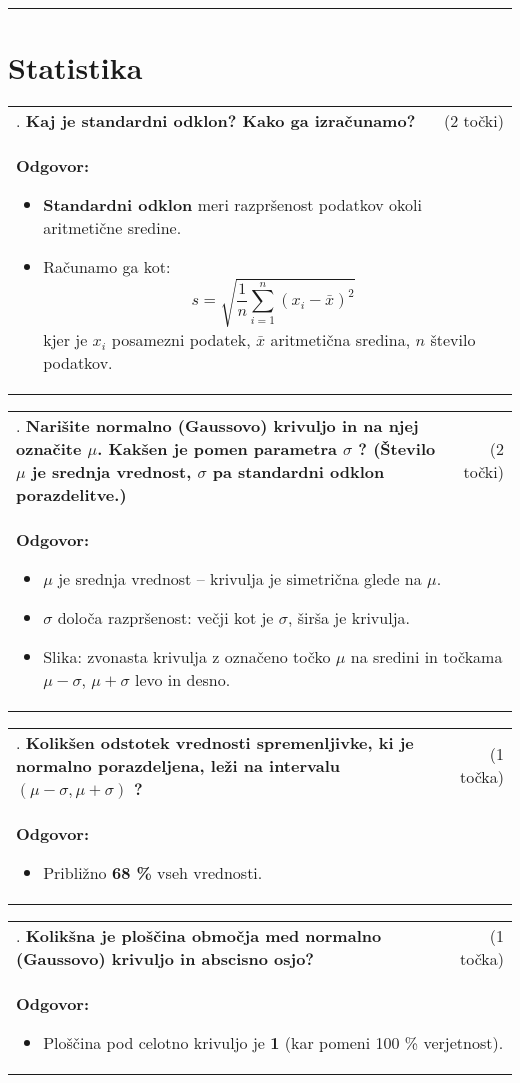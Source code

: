 \documentclass[12pt]{article}
\newcounter{vprasanje}[section]
\renewcommand{\thevprasanje}{\roman{vprasanje}}
\newcommand{\vprasanje}[2]{%
  \stepcounter{vprasanje}%
  \textbf{\thevprasanje}. \textbf{#1} & (#2) \\
}
\newcommand{\odgovor}[1]{%
  \multicolumn{2}{p{\dimexpr\textwidth-2\tabcolsep\relax}}{%
    \small \textbf{Odgovor:} #1%
  } \\[1em]%
}
\newcommand{\crta}{\rule{\textwidth}{0.4pt}}
\newcommand{\naslov}[1]{%
  \vspace{1em} 
  \section{#1}
  \addcontentsline{toc}{section}{\protect\numberline{}#1}%
}
\newcommand{\razmak}[1]{%
  \vspace{#1}
}
\begin{document}
\razmak{0.5em}


\crta

\naslov{Statistika}

\begin{tabularx}{\textwidth}{X r}
\vprasanje{Kaj je standardni odklon? Kako ga izračunamo?}{2 točki}
\odgovor{
\begin{itemize}
  \item \textbf{Standardni odklon} meri razpršenost podatkov okoli aritmetične sredine.
  \item Računamo ga kot:
  \[
  s = \sqrt{\frac{1}{n} \sum_{i=1}^{n} (x_i - \bar{x})^2}
  \]
  kjer je $x_i$ posamezni podatek, $\bar{x}$ aritmetična sredina, $n$ število podatkov.
\end{itemize}
}
\end{tabularx}

\begin{tabularx}{\textwidth}{X r}
\vprasanje{Narišite normalno (Gaussovo) krivuljo in na njej označite $\mu$. Kakšen je pomen parametra $\sigma$ ? (Število $\mu$ je srednja vrednost, $\sigma$ pa standardni odklon porazdelitve.)}{2 točki}
\odgovor{
\begin{itemize}
  \item \textbf{$\mu$} je srednja vrednost – krivulja je simetrična glede na $\mu$.
  \item \textbf{$\sigma$} določa razpršenost: večji kot je $\sigma$, širša je krivulja.
  \item Slika: zvonasta krivulja z označeno točko $\mu$ na sredini in točkama $\mu - \sigma$, $\mu + \sigma$ levo in desno.
\end{itemize}
}
\end{tabularx}

\begin{tabularx}{\textwidth}{X r}
\vprasanje{Kolikšen odstotek vrednosti spremenljivke, ki je normalno porazdeljena, leži na intervalu $(\mu-\sigma, \mu+\sigma)$ ?}{1 točka}
\odgovor{
\begin{itemize}
	\item Približno \textbf{68 \%} vseh vrednosti.
\end{itemize}
}
\end{tabularx}

\begin{tabularx}{\textwidth}{X r}
\vprasanje{Kolikšna je ploščina območja med normalno (Gaussovo) krivuljo in abscisno osjo?}{1 točka}
\odgovor{
\begin{itemize}
	\item Ploščina pod celotno krivuljo je \textbf{1} (kar pomeni 100 \% verjetnost).
\end{itemize}
}
\end{tabularx}
\razmak{0.5em}


\fancyhf{}                    
\renewcommand{\headrulewidth}{0pt}
\renewcommand{\footrulewidth}{0pt}  
\pagestyle{fancy}
\end{document}
